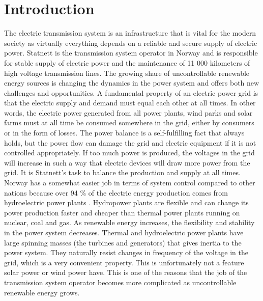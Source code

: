 \documentclass[class=book, crop=false]{standalone}
\begin{document}
\chapter{Introduction}\label{chapter:introduction}
The electric transmission system is an infrastructure that is vital for the modern society as virtually everything depends on a reliable and secure supply of electric power. Statnett is the transmission system operator in Norway and is responsible for stable supply of electric power and the  maintenance of 11 000 kilometers of high voltage transmission lines. The growing share of uncontrollable renewable energy sources is changing the dynamics in the power system and offers both new challenges and opportunities. A fundamental property of an electric power grid is that the electric supply and demand must equal each other at all times. In other words, the electric power generated from all power plants, wind parks and solar farms must at all time be consumed somewhere in the grid, either by consumers or in the form of losses. The power balance is a self-fulfilling fact that always holds, but the power flow can damage the grid and electric equipment if it is not controlled appropriately. If too much power is produced, the voltages in the grid will increase in such a way that electric devices will draw more power from the grid. It is Statnett's task to balance the production and supply at all times. Norway has a somewhat easier job in terms of system control compared to other nations because over 94 \% of the electric energy production comes from hydroelectric power plants \cite{energifakta_norge}. Hydropower plants are flexible and can change its power production faster and cheaper than thermal power plants running on nuclear, coal and gas. As renewable energy increases, the flexibility and stability in the power system decreases. Thermal and hydroelectric power plants have large spinning masses (the turbines and generators) that gives inertia to the power system. They naturally resist changes in frequency of the voltage in the grid, which is a very convenient property. This is unfortunately not a feature solar power or wind power have. This is one of the reasons that the job of the transmission system operator becomes more complicated as uncontrollable renewable energy grows. 
\end{document}
